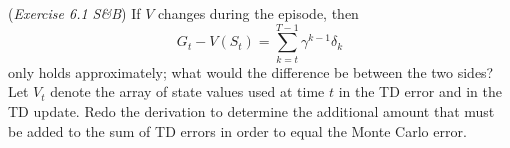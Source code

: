 (\textit{Exercise 6.1 S\&B})
If $V$ changes during the episode, then
$$G_{t} - V(S_{t}) = \sum_{k=t}^{T-1}\gamma^{{k-1}}\delta_{k} $$
only holds approximately; what would the difference be between the two sides? Let $V_{t}$ denote the array of state values used at time $t$ in the TD error and in the TD update.
Redo the derivation to determine the additional amount that must be added to the sum of TD errors in order to equal the Monte Carlo error.


